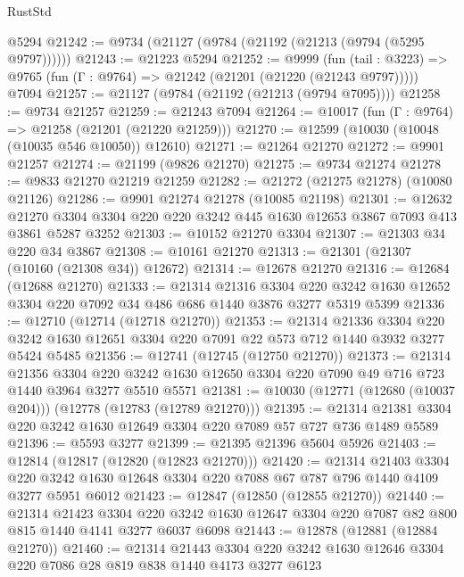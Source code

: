 \begin{lexlean}{RustStd}
\begin{coremodule}
    @5294
@21242 := @9734 (@21127 (@9784 (@21192 (@21213 (@9794 (@5295 @9797))))))
@21243 := @21223 @5294
@21252 := @9999
    (fun (tail : @3223) => @9765 (fun (Γ : @9764) => @21242 (@21201 (@21220 (@21243 @9797)))))
    @7094
@21257 := @21127 (@9784 (@21192 (@21213 (@9794 @7095))))
@21258 := @9734 @21257
@21259 := @21243 @7094
@21264 := @10017 (fun (Γ : @9764) => @21258 (@21201 (@21220 @21259)))
@21270 := @12599 (@10030 (@10048 (@10035 @546 @10050)) @12610)
@21271 := @21264 @21270
@21272 := @9901 @21257
@21274 := @21199 (@9826 @21270)
@21275 := @9734 @21274
@21278 := @9833 @21270 @21219 @21259
@21282 := @21272 (@21275 @21278) (@10080 @21126)
@21286 := @9901 @21274 @21278 (@10085 @21198)
@21301 := @12632
    @21270
    @3304
    @3304
    @220
    @220
    @3242
    @445
    @1630
    @12653
    @3867
    @7093
    @413
    @3861
    @5287
    @3252
@21303 := @10152 @21270 @3304
@21307 := @21303 @34 @220 @34 @3867
@21308 := @10161 @21270
@21313 := @21301 (@21307 (@10160 (@21308 @34)) @12672)
@21314 := @12678 @21270
@21316 := @12684 (@12688 @21270)
@21333 := @21314
    @21316
    @3304
    @220
    @3242
    @1630
    @12652
    @3304
    @220
    @7092
    @34
    @486
    @686
    @1440
    @3876
    @3277
    @5319
    @5399
@21336 := @12710 (@12714 (@12718 @21270))
@21353 := @21314
    @21336
    @3304
    @220
    @3242
    @1630
    @12651
    @3304
    @220
    @7091
    @22
    @573
    @712
    @1440
    @3932
    @3277
    @5424
    @5485
@21356 := @12741 (@12745 (@12750 @21270))
@21373 := @21314
    @21356
    @3304
    @220
    @3242
    @1630
    @12650
    @3304
    @220
    @7090
    @49
    @716
    @723
    @1440
    @3964
    @3277
    @5510
    @5571
@21381 := @10030 (@12771 (@12680 (@10037 @204))) (@12778 (@12783 (@12789 @21270)))
@21395 := @21314 @21381 @3304 @220 @3242 @1630 @12649 @3304 @220 @7089 @57 @727 @736 @1489 @5589
@21396 := @5593 @3277
@21399 := @21395 @21396 @5604 @5926
@21403 := @12814 (@12817 (@12820 (@12823 @21270)))
@21420 := @21314
    @21403
    @3304
    @220
    @3242
    @1630
    @12648
    @3304
    @220
    @7088
    @67
    @787
    @796
    @1440
    @4109
    @3277
    @5951
    @6012
@21423 := @12847 (@12850 (@12855 @21270))
@21440 := @21314
    @21423
    @3304
    @220
    @3242
    @1630
    @12647
    @3304
    @220
    @7087
    @82
    @800
    @815
    @1440
    @4141
    @3277
    @6037
    @6098
@21443 := @12878 (@12881 (@12884 @21270))
@21460 := @21314
    @21443
    @3304
    @220
    @3242
    @1630
    @12646
    @3304
    @220
    @7086
    @28
    @819
    @838
    @1440
    @4173
    @3277
    @6123

\end{coremodule}
\end{lexlean}

